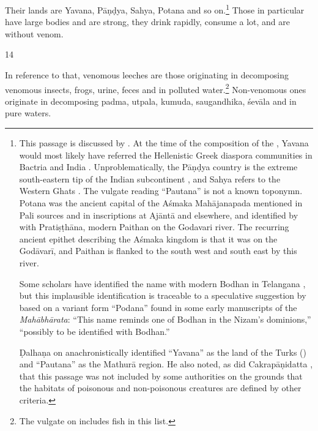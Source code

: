 \begin{translation}
Their lands are Yavana, Pāṇḍya, Sahya, Potana and so on.\footnote{This
    passage is discussed by \citet[109--110, 388--389]{kart-2015}.  At the time
    of the composition of the \SS, Yavana would most likely have referred the
    Hellenistic Greek diaspora communities in Bactria and India
    \parencites[136--137]{law-1984}{mair-2013}{mair-2014}. Unproblematically,
    the Pāṇḍya country is the extreme south-eastern tip of the Indian
    subcontinent \citep[E8, p.\,20 \emph{et passim}]{schw-1978}, and Sahya
    refers to the Western Ghats \citep[D5--7, p.\,20 \emph{et
    passim}]{schw-1978}.  The vulgate reading “Pautana” is not a known toponymn.
    Potana was the ancient capital of the Aśmaka Mahājanapada mentioned in Pali
    sources and in inscriptions at Ajāntā and elsewhere, and identified by
    \textcites[142, 179]{law-1984}[18]{gupt-1989} with Pratiṣṭhāna, modern
    Paithan on the Godavari river.  The recurring ancient epithet describing the
    Aśmaka kingdom is that it was on the Godāvarī, and Paithan is flanked to the
    south west and south east by this river.
    
    Some scholars have identified the name with modern Bodhan in Telangana
\parencites[189]{sirc-1971}[E6, p.\,14, 140 \emph{et
passim}]{schw-1978}[102]{sen-1988}, but this implausible identification
is traceable to a speculative suggestion by \citet[89, n.\,5,
143]{rayc-1953} based on a variant form “Podana” found in some early
manuscripts of the \emph{Mahābhārata}: “This name reminds one of Bodhan
in the Nizam's dominions,” “possibly to be identified with Bodhan.”
    
         Ḍalhaṇa on  anachronistically identified “Yavana”
as the land of the Turks () and “Pautana” as the
Mathurā region.  He also noted, as did Cakrapāṇidatta
\citep[97]{acar-1939}, that this passage was not included by some
authorities on the grounds that the habitats of poisonous and
non-poisonous creatures are defined by other criteria.}  Those in
particular have large bodies and are strong, they drink rapidly,
consume a lot, and are without venom.

\item [14]

In reference to that, venomous leeches are those originating in decomposing
venomous insects, frogs, urine, feces and in polluted water.\footnote{The
    vulgate on  includes fish in this list.}  Non-venomous
    ones originate in decomposing \gls{padma}, \gls{utpala}, \gls{kumuda},
    \gls{saugandhika}, \gls{śevāla} and in pure waters.


\end{translation}
